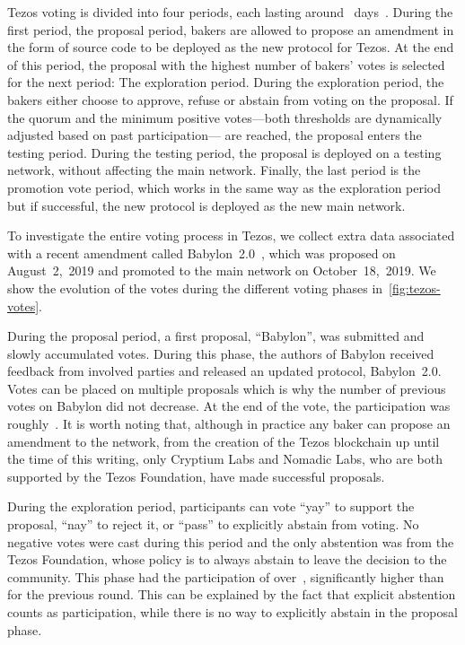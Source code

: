 Tezos voting is divided into four periods, each lasting around~ days~\cite{Goodman2014}. During the first period, the proposal period, bakers are allowed to propose an amendment in the form of source code to be deployed as the new protocol for Tezos.
At the end of this period, the proposal with the highest number of bakers' votes is selected for the next period: The exploration period. During the exploration period, the bakers either choose to approve, refuse or abstain from voting on the proposal. If the quorum and the minimum positive votes---both thresholds are dynamically adjusted based on past participation--- are reached, the proposal enters the testing period. During the testing period, the proposal is deployed on a testing network, without affecting the main network. Finally, the last period is the promotion vote period, which works in the same way as the exploration period but if successful, the new protocol is deployed as the new main network.

To investigate the entire voting process in Tezos, we collect extra data associated with a recent amendment called Babylon~2.0~\cite{CryptiumLabs2019}, which was proposed on August~2,~2019 and promoted to the main network on October~18,~2019. 
We show the evolution of the votes during the different voting phases in~\autoref{fig:tezos-votes}.

During the proposal period, a first proposal, ``Babylon'', was submitted and slowly accumulated votes.
During this phase, the authors of Babylon received feedback from involved parties and released an updated protocol, Babylon~2.0. Votes can be placed on multiple proposals which is why the number of previous votes on Babylon did not decrease. At the end of the vote, the participation was roughly~. It is worth noting that, although in practice any baker can propose an amendment to the network, from the creation of the Tezos blockchain up until the time of this writing, only Cryptium Labs and Nomadic Labs, who are both supported by the Tezos Foundation, have made successful proposals.

During the exploration period, participants can vote ``yay'' to support the proposal, ``nay'' to reject it, or ``pass'' to explicitly abstain from voting. No negative votes were cast during this period and the only abstention was from the Tezos Foundation, whose policy is to always abstain to leave the decision to the community. This phase had the participation of over~, significantly higher than for the previous round. This can be explained by the fact that explicit abstention counts as participation, while there is no way to explicitly abstain in the proposal phase.

